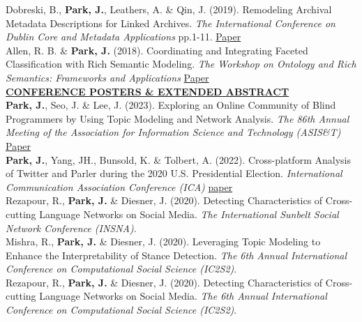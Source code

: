 \documentclass{article}
\begin{document}
\noindent Dobreski, B., \textbf{Park, J.}, Leathers, A. \& Qin, J. (2019). Remodeling Archival Metadata Descriptions for Linked Archives. \textit{The International Conference on Dublin Core and Metadata Applications} pp.1-11. \hfill \href{https://dcpapers.dublincore.org/article/952141553}{Paper} \\ 

\noindent Allen, R. B. \& \textbf{Park, J.} (2018). Coordinating and Integrating Faceted Classification with Rich Semantic Modeling. \textit{The Workshop on Ontology and Rich Semantics: Frameworks and Applications} \hfill \href{https://arxiv.org/abs/1809.09548}{Paper} \\

\noindent \textbf{\underline{CONFERENCE POSTERS \& EXTENDED ABSTRACT}} \\
\noindent \textbf{Park, J.}, Seo, J. \& Lee, J. (2023). Exploring an Online Community of Blind Programmers by Using Topic Modeling and Network Analysis. \textit{The 86th Annual Meeting of the Association for Information Science and Technology (ASIS\&T)} \hfill \href{https://doi.org/10.1002/pra2.956}{Paper} \\

\noindent \textbf{Park, J.}, Yang, JH., Bunsold, K. \& Tolbert, A. (2022). Cross-platform Analysis of Twitter and Parler during the 2020 U.S. Presidential Election. \textit{International Communication Association Conference (ICA)} \hfill \href{https://www.ideals.illinois.edu/items/121292}{paper} \\ 

\noindent Rezapour, R., \textbf{Park, J.} \& Diesner, J. (2020). Detecting Characteristics of Cross-cutting Language Networks on Social Media. \textit{The International Sunbelt Social Network Conference (INSNA)}. \\

\noindent Mishra, R., \textbf{Park, J.} \& Diesner, J. (2020). Leveraging Topic Modeling to Enhance the Interpretability of Stance Detection. \textit{The 6th Annual International Conference on Computational Social Science (IC2S2)}. \\

\noindent Rezapour, R., \textbf{Park, J.} \& Diesner, J. (2020). Detecting Characteristics of Cross-cutting Language Networks on Social Media. \textit{The 6th Annual International Conference on Computational Social Science (IC2S2)}. \\

\end{document}
